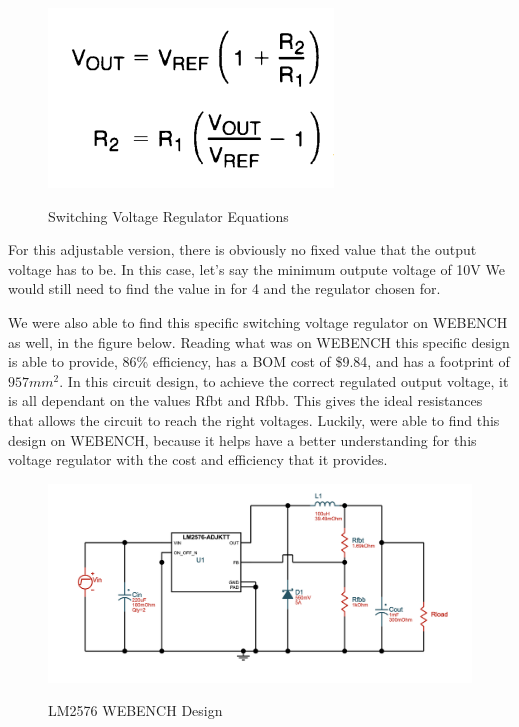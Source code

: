 \begin{figure}[H]
    \centering
    \caption{Switching Voltage Regulator Equations}
    \includegraphics[width=\textwidth]{images/LM2576_Adjustable_equations.png}
    \label{fig:switching-voltage-regulator-equations}
\end{figure}
For this adjustable version, there is obviously no fixed value that the output voltage has to be. In this case, let's say the minimum outpute voltage of 10V We would still need to find the value in for 4 and the regulator chosen for. \par
We were also able to find this specific switching voltage regulator on WEBENCH as well, in the figure below. Reading what was on WEBENCH this specific design is able to provide, 86\% efficiency, has a BOM cost of \$9.84, and has a footprint of $957mm^2$. In this circuit design, to achieve the correct regulated output voltage, it is all dependant on the values Rfbt and Rfbb. This gives the ideal resistances that allows the circuit to reach the right voltages. Luckily, were able to find this design on WEBENCH, because it helps have a better understanding for this voltage regulator with the cost and efficiency that it provides. 
\begin{figure}[H]
    \centering
    \caption{LM2576 WEBENCH Design}
    \includegraphics[width=\textwidth]{images/LM2576_WEBENCH.png}
    \label{fig:LM2576 WEBENCH Design}
\end{figure}
